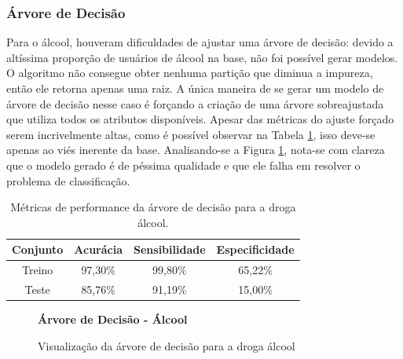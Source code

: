 \documentclass[
	article,			%
	11pt,				%
	oneside,			%
	a4paper,			%
	english,			%
	brazil,				%
	sumario=tradicional
	]{abntex2}
\begin{document}
\subsubsection{Árvore de Decisão}

Para o álcool, houveram dificuldades de ajustar uma árvore de decisão: devido a altíssima proporção de usuários de álcool na base, não foi possível gerar modelos. O algoritmo não consegue obter nenhuma partição que diminua a impureza, então ele retorna apenas uma raiz. A única maneira de se gerar um modelo de árvore de decisão nesse caso é forçando a criação de uma árvore sobreajustada que utiliza todos os atributos disponíveis. Apesar das métricas do ajuste forçado serem incrivelmente altas, como é possível observar na Tabela \ref{resultadosdt_alcool}, isso deve-se apenas ao viés inerente da base. Analisando-se a Figura \ref{fig_DTAlcohol}, nota-se com clareza que o modelo gerado é de péssima qualidade e que ele falha em resolver o problema de classificação.

\begin{table}[H]
\centering
\begin{tabular}{||c|c|c|c||}
\hline
Conjunto & Acurácia & Sensibilidade & Especificidade \\ \hline
Treino & 97,30\% & 99,80\% & 65,22\% \\ \hline
Teste & 85,76\% & 91,19\% & 15,00\% \\ \hline
\end{tabular}
\caption{Métricas de performance da árvore de decisão para a droga álcool.}
\label{resultadosdt_alcool}
\end{table}

\begin{figure}[H]
    \centering
    \textbf{Árvore de Decisão - Álcool}\par\medskip
    \caption{Visualização da árvore de decisão para a droga álcool}
    \label{fig_DTAlcohol}
\end{figure}
\end{document}
